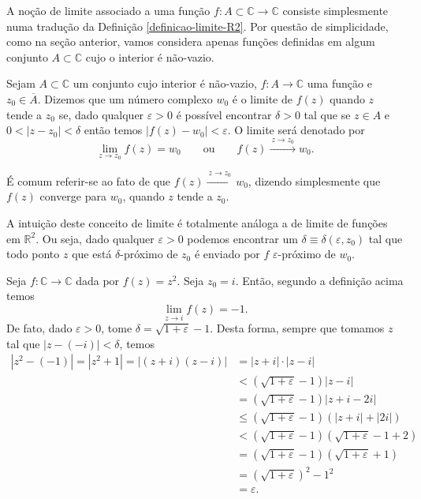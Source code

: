 \bigskip 

A noção de limite associado a uma função $f:A\subset \mathbb{C}\to\mathbb{C}$ 
consiste simplesmente numa tradução da Definição \ref{definicao-limite-R2}.
Por questão de simplicidade, como na seção anterior, vamos considera apenas 
funções definidas em algum conjunto $A\subset\mathbb{C}$
cujo o interior é não-vazio. 

\begin{definicao}\label{def-limite-func-complexa}
Sejam $A\subset \mathbb{C}$ um conjunto cujo interior é não-vazio, $f:A\to\mathbb{C}$ uma 
função e $z_0\in \overline{A}$. Dizemos que um número complexo $w_0$ 
é o limite de $f(z)$ quando $z$ tende a $z_0$ se, dado qualquer $\varepsilon>0$ é possível
encontrar $\delta>0$ tal que se $z\in A$ e  $0<|z-z_0|<\delta$ então  temos $|f(z)-w_0|<\varepsilon$.
O limite será denotado por
\[
\lim_{z\to z_0} f(z) = w_0\qquad \text{ou} \qquad f(z)\xrightarrow{\ z\to z_0\ }w_0.
\]
\end{definicao}
É comum referir-se ao fato de que $f(z)\xrightarrow{\ z\to z_0\ }w_0$, dizendo simplesmente
que $f(z)$ converge para $w_0$, quando $z$ tende a $z_0$.

A intuição deste conceito de limite é totalmente análoga a de limite de funções em $\mathbb{R}^2$.
Ou seja, dado qualquer $\varepsilon>0$ podemos encontrar um $\delta\equiv \delta(\varepsilon,z_0)$ 
tal que todo ponto $z$ que está $\delta$-próximo de $z_0$ é enviado por $f$ $\varepsilon$-próximo de $w_0$.

\begin{exemplo}
Seja $f:\mathbb{C}\to\mathbb{C}$ dada por $f(z)=z^2$.  Seja $z_0=i$. Então, segundo a definição acima 
temos 
\[
\lim_{z\to i } f(z) = -1.
\]
De fato, dado $\varepsilon>0$, tome $\delta = \sqrt{1+\varepsilon} -1$. Desta forma, sempre que tomamos
$z$ tal que $|z-(-i)|<\delta$, temos
\begin{align*}
|z^2-(-1)|=|z^2+1|= |(z+i)(z-i)| 
&= |z+i|\cdot |z-i|
\\
&<
(\sqrt{1+\varepsilon} -1) |z-i|
\\
&=
(\sqrt{1+\varepsilon} -1) |z+i-2i|
\\
&\leqslant
(\sqrt{1+\varepsilon} -1) (|z+i|+|2i|)
\\
&<
(\sqrt{1+\varepsilon} -1) (\sqrt{1+\varepsilon} -1+2)
\\
&=
(\sqrt{1+\varepsilon} -1) (\sqrt{1+\varepsilon} +1)
\\
&=
(\sqrt{1+\varepsilon})^2-1^2
\\
&=
\varepsilon.
\end{align*}
\end{exemplo}

